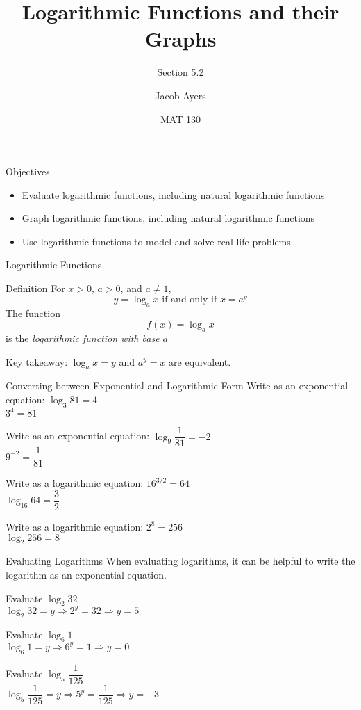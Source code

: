 \documentclass[t, aspectratio=169]{beamer}
\title[5.2]{Logarithmic Functions and their Graphs}
\subtitle{Section 5.2}
\author{Jacob Ayers}
\institute{Lesson \#18}
\date{MAT 130}
\def\then{\Rightarrow}
\begin{document}
	
	\begin{frame}
		\titlepage
	\end{frame}
	
	\begin{frame}{Objectives}
		\begin{itemize}
			\item Evaluate logarithmic functions, including natural logarithmic functions
			\item Graph logarithmic functions, including natural logarithmic functions
			\item Use logarithmic functions to model and solve real-life problems
		\end{itemize}
	\end{frame}

	\begin{frame}{Logarithmic Functions}
		\begin{block}{Definition}
			For $x > 0$, $a > 0$, and $a \neq 1$, $$y = \log_a x \text{ if and only if } x = a^y$$ The function $$f(x) = \log_a x$$ is the \textit{logarithmic function with base $a$}
		\end{block} \pause
	
		Key takeaway: $\log_a x = y$ and $a^y = x$ are equivalent.
	\end{frame}

	\begin{frame}{Converting between Exponential and Logarithmic Form}
		Write as an exponential equation: $\log_3 81 = 4$ \pause \\
		$3^4 = 81$ \pause \vspace{12pt}
		
		Write as an exponential equation: $\log_9 \dfrac{1}{81} = -2$ \pause \\
		$9^{-2} = \dfrac{1}{81}$ \pause \vspace{12pt}
		
		Write as a logarithmic equation: $16^{3/2} = 64$ \pause \\
		$\log_{16} 64 = \dfrac32$ \pause \vspace{12pt}
		
		Write as a logarithmic equation: $2^8 = 256$ \pause \\
		$\log_2 256 = 8$
	\end{frame}

	\begin{frame}{Evaluating Logarithms}
		When evaluating logarithms, it can be helpful to write the logarithm as an exponential equation.
		
		Evaluate $\log_2 32$ \pause \\
		$\log_2 32 = y \Rightarrow 2^y = 32 \Rightarrow y = 5$ \pause \vspace{12pt}
		
		Evaluate $\log_6 1$ \pause \\
		$\log_6 1 = y \then 6^y = 1 \Rightarrow y = 0$ \pause \vspace{12pt}
		
		Evaluate $\log_5 \dfrac{1}{125}$ \pause \\
		$\log_5 \dfrac{1}{125} = y \then 5^y = \dfrac{1}{125} \then y = -3$
	\end{frame}
\end{document}
